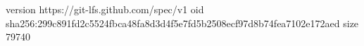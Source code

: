 version https://git-lfs.github.com/spec/v1
oid sha256:299c891fd2c5524fbca48fa8d3d4f5e7fd5b2508ecf97d8b74fea7102e172aed
size 79740
